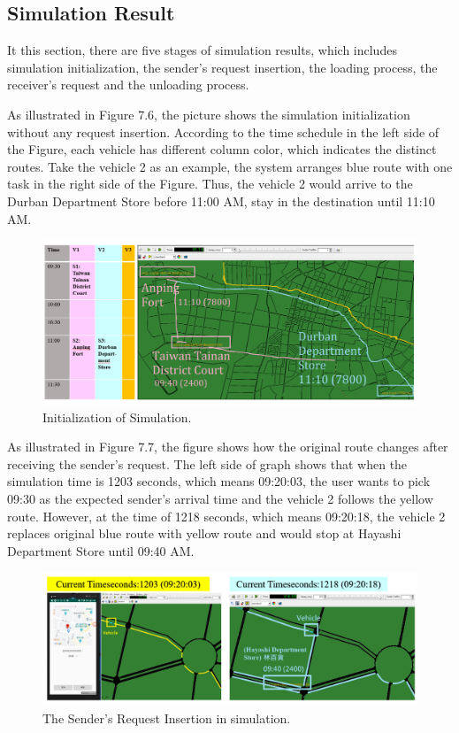 \documentclass[12pt]{ksthesis}
\begin{document}
\begin{thesis}
{\section{Simulation Result}
It this section, there are five stages of simulation results, which includes simulation initialization, the sender’s request insertion, the loading process, the receiver’s request and the unloading process.

As illustrated in Figure 7.6, the picture shows the simulation initialization without any request insertion. According to the time schedule in the left side of the Figure, each vehicle has different column color, which indicates the distinct routes. Take the vehicle 2 as an example, the system arranges blue route with one task in the right side of the Figure. Thus, the vehicle 2 would arrive to the Durban Department Store before 11:00 AM, stay in the destination until 11:10 AM.

\begin{figure}[H]
\centering
\includegraphics[width=1.12\textwidth]{./Thesis_figures/F7-6_initialization.PNG}
\caption{\large Initialization of Simulation.}
\vspace{0.5cm}
\label{Fig:Initialization_of_Simulation}
\end{figure}

As illustrated in Figure 7.7, the figure shows how the original route changes after receiving the sender’s request.
The left side of graph shows that when the simulation time is 1203 seconds, which means 09:20:03, the user wants to pick 09:30 as the expected sender’s arrival time and the vehicle 2 follows the yellow route. However, at the time of 1218 seconds, which means 09:20:18, the vehicle 2 replaces original blue route with yellow route and would stop at Hayashi Department Store until 09:40 AM.

\begin{figure}[H]
\centering
\includegraphics[width=1.12\textwidth]{./Thesis_figures/F7-7_senderRequest.PNG}
\caption{\large The Sender’s Request Insertion in simulation.}
\vspace{0.5cm}
\label{Fig:sender_request}
\end{figure}


}
\end{thesis}
\end{document}
